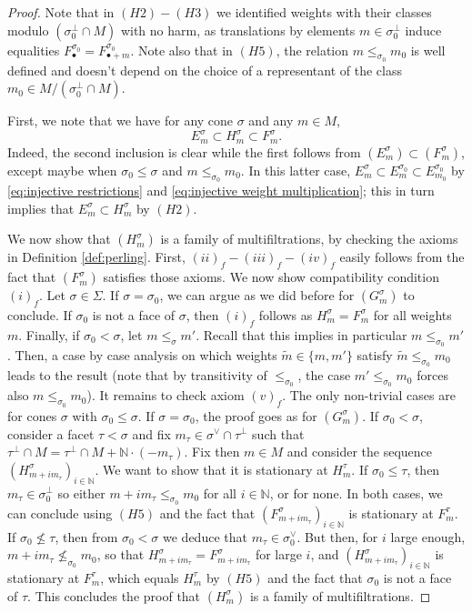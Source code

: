 \documentclass[a4paper,10pt]{amsart}
\theoremstyle{plain}{
    \newtheorem{theorem}{Theorem}[section]
    \newtheorem{lemma}[theorem]{Lemma}
    \newtheorem{corollary}[theorem]{Corollary}
    \newtheorem{proposition}[theorem]{Proposition}
    \newtheorem{conjecture}[theorem]{Conjecture}
}
\theoremstyle{definition}{
    \newtheorem{definition}[theorem]{Definition}
    \newtheorem{defn-thm}[theorem]{Definition-Theorem}
    \newtheorem{example}[theorem]{Example}
    \newtheorem{notation}[theorem]{Notation}
}
\theoremstyle{remark}{
    \newtheorem{remark}[theorem]{Remark}
    \newtheorem{problem}[theorem]{Problem}
    \newtheorem{question}[theorem]{Question}
}
\def\N{\mathbb{N}}
\begin{document}
\begin{proof}
 Note that  in $(H2)-(H3)$ we identified weights with their classes modulo $(\sigma_0^\perp\cap M)$ with no harm, as translations by elements $m\in\sigma_0^\perp$ induce equalities $F^{\sigma_0}_\bullet=F^{\sigma_0}_{\bullet+m}$. Note also that in $(H5)$, the relation $m\leq_{\sigma_0} m_0$ is well defined and doesn't depend on the choice of a representant of the class $m_0\in M/(\sigma_0^\perp\cap M)$.
 
 First, we note that we have for any cone $\sigma$ and any $m\in M$, 
 $$
 E^\sigma_m\subset H^\sigma_m\subset F^\sigma_m.
 $$
 Indeed, the second inclusion is clear while the first  follows from $(E^\sigma_m)\subset (F^\sigma_m)$, except maybe when $\sigma_0\leq \sigma$ and $m\leq_{\sigma_0} m_0$. In this latter case, $E^\sigma_m\subset E_m^{\sigma_0}\subset E_{m_0}^{\sigma_0}$ by \eqref{eq:injective restrictions} and \eqref{eq:injective weight multiplication}; this in turn implies that $E^\sigma_m\subset H^\sigma_m$ by $(H2)$.
 
 We now show that $(H^\sigma_m)$ is a family of multifiltrations, by checking the axioms in Definition \ref{def:perling}. First, $(ii)_f-(iii)_f-(iv)_f$ easily follows  from the fact that $(F^\sigma_m)$ satisfies those axioms. We now show compatibility condition $(i)_f$. Let $\sigma\in\Sigma$. If $\sigma=\sigma_0$, we can argue as we did before for $(G^\sigma_m)$ to conclude.  If $\sigma_0$ is not a face of $\sigma$, then $(i)_f$ follows as $H^\sigma_m=F^\sigma_m$ for all weights $m$. Finally, if $\sigma_0<\sigma$, let $m\leq_\sigma m'$. Recall that this implies in particular $m\leq_{\sigma_0} m'$. Then, a case by case analysis on which weights $\tilde m\in\lbrace m,m'\rbrace$ satisfy $\tilde m\leq_{\sigma_0} m_0$ leads to the result (note that by transitivity of $\leq_{\sigma_0}$, the case  $m'\leq_{\sigma_0} m_0$ forces also $m\leq_{\sigma_0}m_0$). It remains to check axiom $(v)_f$. The only non-trivial cases are for cones $\sigma$ with $\sigma_0\leq \sigma$. If $\sigma=\sigma_0$, the proof goes as for $(G^\sigma_m)$. If $\sigma_0 < \sigma$, consider a facet $\tau <\sigma$ and fix $m_\tau\in \sigma^\vee\cap\tau^\perp$ such that $\tau^\perp\cap M=\tau^\perp\cap M+\N\cdot (-m_\tau)$. Fix then $m\in M$ and consider the sequence $(H^\sigma_{m+im_\tau})_{i\in\N}$. We want to show that it is stationary at $H^\tau_m$. If $\sigma_0\leq \tau$, then $m_\tau\in \sigma_0^\perp$ so either $m+im_\tau\leq_{\sigma_0} m_0$ for all $i\in\N$, or for none. In both cases, we can conclude using $(H5)$ and the fact that  $(F^\sigma_{m+im_\tau})_{i\in\N}$ is stationary at $F^\tau_m$. If $\sigma_0\nleq \tau$, then from $\sigma_0 < \sigma$ we deduce that $m_\tau\in\sigma_0^\vee$. But then, for $i$ large enough, $m+im_\tau\nleq_{\sigma_0} m_0$, so that $H^\sigma_{m+im_\tau}=F^\sigma_{m+im_\tau}$ for large $i$, and $(H^\sigma_{m+im_\tau})_{i\in\N}$ is stationary at $F^\tau_m$, which equals $H^\tau_m$ by $(H5)$ and the fact that $\sigma_0$ is not a face of $\tau$.  This concludes the proof that $(H^\sigma_m)$ is a family of multifiltrations.
 

\end{proof}
\end{document}
